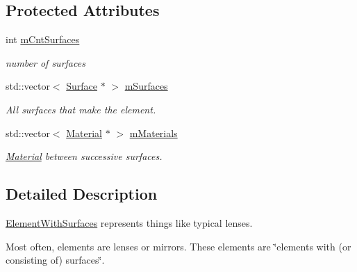\subsection*{Protected Attributes}
\begin{DoxyCompactItemize}
\item 
int \hyperlink{classElementWithSurfaces_a86e3872cf6bd9b6bb3d5d9b504dbbaa8}{m\+Cnt\+Surfaces}\hypertarget{classElementWithSurfaces_a86e3872cf6bd9b6bb3d5d9b504dbbaa8}{}\label{classElementWithSurfaces_a86e3872cf6bd9b6bb3d5d9b504dbbaa8}

\begin{DoxyCompactList}\small\item\em number of surfaces \end{DoxyCompactList}\item 
std\+::vector$<$ \hyperlink{classSurface}{Surface} $\ast$ $>$ \hyperlink{classElementWithSurfaces_a3fb5888bb6ec5de9d7fe81bbbc2d2afd}{m\+Surfaces}\hypertarget{classElementWithSurfaces_a3fb5888bb6ec5de9d7fe81bbbc2d2afd}{}\label{classElementWithSurfaces_a3fb5888bb6ec5de9d7fe81bbbc2d2afd}

\begin{DoxyCompactList}\small\item\em All surfaces that make the element. \end{DoxyCompactList}\item 
std\+::vector$<$ \hyperlink{classMaterial}{Material} $\ast$ $>$ \hyperlink{classElementWithSurfaces_af2900bba23d0aa0bdc38f69dcc00e086}{m\+Materials}\hypertarget{classElementWithSurfaces_af2900bba23d0aa0bdc38f69dcc00e086}{}\label{classElementWithSurfaces_af2900bba23d0aa0bdc38f69dcc00e086}

\begin{DoxyCompactList}\small\item\em \hyperlink{classMaterial}{Material} between successive surfaces. \end{DoxyCompactList}\end{DoxyCompactItemize}


\subsection{Detailed Description}
\hyperlink{classElementWithSurfaces}{Element\+With\+Surfaces} represents things like typical lenses. 

Most often, elements are lenses or mirrors. These elements are \char`\"{}elements with (or consisting of) surfaces\char`\"{}.

